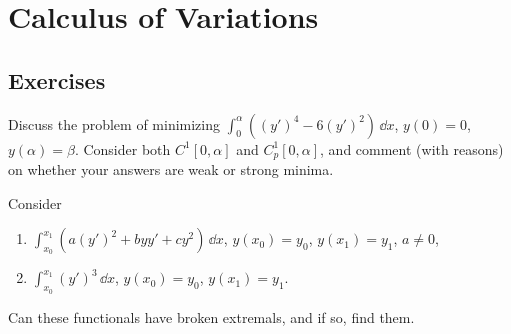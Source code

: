 \flushbottom






\chapter{Calculus of Variations}












\raggedbottom
\pagebreak
\flushbottom
\section{Exercises}




\begin{Exercise}
  Discuss the problem of minimizing $\int_0^\alpha ((y')^4 - 6 (y')^2) \,\dd x$,
  $y(0) = 0$, $y(\alpha) = \beta$.  Consider both $C^1[0,\alpha]$ and
  $C^1_p[0,\alpha]$, and comment (with reasons) on whether your answers
  are weak or strong minima.
\end{Exercise}





\begin{Exercise}
  Consider
  \begin{enumerate}
  \item
    $\int_{x_0}^{x_1} (a (y')^2 + b y y' + c y^2 )\,\dd x$, $y(x_0) = y_0$,
    $y(x_1) = y_1$, $a \neq 0$,
  \item
    $\int_{x_0}^{x_1} (y')^3 \,\dd x$, $y(x_0) = y_0$, $y(x_1) = y_1$.
  \end{enumerate}
  Can these functionals have broken extremals, and if so, find them.
\end{Exercise}


